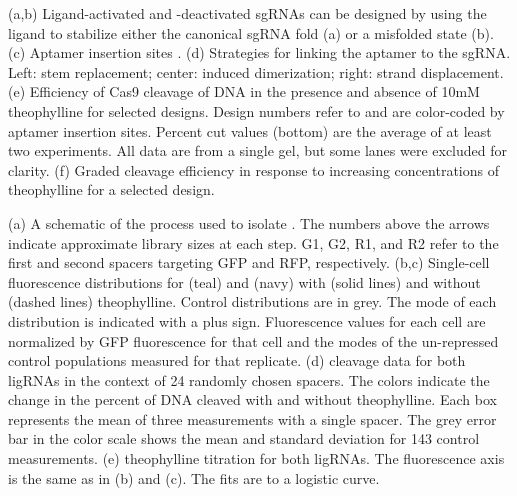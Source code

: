 \documentclass[10pt,oneside]{article}
\begin{document}
 (a,b) Ligand-activated and -deactivated sgRNAs can be designed by using the ligand to stabilize either the canonical sgRNA fold (a) or a misfolded state (b).
%
%
 (c) Aptamer insertion sites \autocite{briner2014}.
%
%
% 
%
 (d) Strategies for linking the aptamer to the sgRNA.  Left: stem replacement; center: induced dimerization; right: strand displacement.
%
%
% 
%
 (e) Efficiency of \invitro{} Cas9 cleavage of DNA in the presence and absence of 10mM theophylline for selected designs.  Design numbers refer to  and are color-coded by aptamer insertion sites.  Percent cut values (bottom) are the average of at least two experiments.  All data are from a single gel, but some lanes were excluded for clarity.
%
%
% 
%
 (f) Graded cleavage efficiency in response to increasing concentrations of theophylline for a selected design.



 (a) A schematic of the process used to isolate \ligrnaF{}.  The numbers above the arrows indicate approximate library sizes at each step.  G1, G2, R1, and R2 refer to the first and second spacers targeting GFP and RFP, respectively.
 (b,c) Single-cell fluorescence distributions for \ligrnaF{} (teal) and \ligrnaB{} (navy) with (solid lines) and without (dashed lines) theophylline.  Control distributions are in grey.  The mode of each distribution is indicated with a plus sign.  Fluorescence values for each cell are normalized by GFP fluorescence for that cell and the modes of the un-repressed control populations measured for that replicate.
 (d) \Invitro{} cleavage data for both ligRNAs in the context of 24 randomly chosen spacers.  The colors indicate the change in the percent of DNA cleaved with and without theophylline.  Each box represents the mean of three measurements with a single spacer.   The grey error bar in the color scale shows the mean and standard deviation for 143 control measurements.
 (e) \Invivo{} theophylline titration for both ligRNAs.  The fluorescence axis is the same as in (b) and (c).  The fits are to a logistic curve.
 
\end{document}
